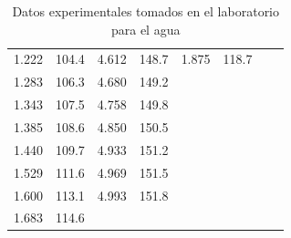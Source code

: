 \documentclass[a4paper,12pt,titlepage]{article}
\begin{document}
\begin{table}[]
\begin{tabular}{|cccccccc}
\multicolumn{1}{|c|}{1.222}       & \multicolumn{1}{c|}{104.4}              & \multicolumn{1}{c|}{4.612}       & \multicolumn{1}{c|}{148.7}              & \multicolumn{1}{c|}{1.875}       & \multicolumn{1}{c|}{118.7}              &                                  &                                         \\ \cline{1-6}
\multicolumn{1}{|c|}{1.283}       & \multicolumn{1}{c|}{106.3}              & \multicolumn{1}{c|}{4.680}       & \multicolumn{1}{c|}{149.2}              &                                  &                                         &                                  &                                         \\ \cline{1-4}
\multicolumn{1}{|c|}{1.343}       & \multicolumn{1}{c|}{107.5}              & \multicolumn{1}{c|}{4.758}       & \multicolumn{1}{c|}{149.8}              &                                  &                                         &                                  &                                         \\ \cline{1-4}
\multicolumn{1}{|c|}{1.385}       & \multicolumn{1}{c|}{108.6}              & \multicolumn{1}{c|}{4.850}       & \multicolumn{1}{c|}{150.5}              &                                  &                                         &                                  &                                         \\ \cline{1-4}
\multicolumn{1}{|c|}{1.440}       & \multicolumn{1}{c|}{109.7}              & \multicolumn{1}{c|}{4.933}       & \multicolumn{1}{c|}{151.2}              &                                  &                                         &                                  &                                         \\ \cline{1-4}
\multicolumn{1}{|c|}{1.529}       & \multicolumn{1}{c|}{111.6}              & \multicolumn{1}{c|}{4.969}       & \multicolumn{1}{c|}{151.5}              &                                  &                                         &                                  &                                         \\ \cline{1-4}
\multicolumn{1}{|c|}{1.600}       & \multicolumn{1}{c|}{113.1}              & \multicolumn{1}{c|}{4.993}       & \multicolumn{1}{c|}{151.8}              &                                  &                                         &                                  &                                         \\ \cline{1-4}
\multicolumn{1}{|c|}{1.683}       & \multicolumn{1}{c|}{114.6}              &                                  &                                         &                                  &                                         &                                  &                                         \\ \cline{1-2}
\end{tabular}
\caption{Datos experimentales tomados en el laboratorio para el agua}
\label{tab:my-table}
\end{table}
\end{document}
